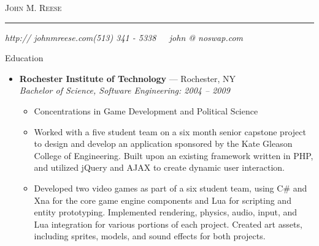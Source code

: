 \documentclass[11pt,oneside]{article}
\makeatletter
\newcommand{\name}{John M. Reese}
\newcommand{\phone}{(513) 341 - 5338}
\newcommand{\email}{john @ noswap.com}
\newcommand{\website}{http:// johnmreese.com}
\newcommand{\bigname}[1]{
	\begin{center}\fontfamily{ppl}\selectfont\Huge\scshape#1\end{center}
}
\newenvironment{ressection}[1]{
	\vspace{8pt}
	{\fontfamily{phv}\selectfont\Large#1}
	\begin{itemize}
	\vspace{3pt}
}{
	\end{itemize}
}
\newcommand{\ressubitem}[1]{
	\vspace{-1pt}
	\item \begin{flushleft} #1 \end{flushleft}
}
\newcommand{\resbigitem}[3]{
	\vspace{-5pt}
	\item
	\textbf{#1} --- #2 \\
	\textit{#3}
}
\newenvironment{ressubsec}[3]{
	\resbigitem{#1}{#2}{#3}
	\vspace{-2pt}
	\begin{itemize}
}{
	\end{itemize}
}
\makeatother
\begin{document}
 \selectfont

\bigname{\name}

\vspace{-8pt} \rule{\textwidth}{1pt}

\vspace{-1pt} {\small\itshape \website \hfill \phone \ \ \ \email}

\vspace{8 pt}




\begin{ressection}{Education}

	\begin{ressubsec}{Rochester Institute of Technology}{Rochester, NY}
	{Bachelor of Science, Software Engineering:  2004 -- 2009}
		\ressubitem{Concentrations in Game Development and Political Science}
		\ressubitem{Worked with a five student team on a six month senior capstone project
		to design and develop an application sponsored by the Kate Gleason College of Engineering.
		Built upon an existing framework written in PHP, and utilized jQuery and AJAX to create
		dynamic user interaction.}
		\ressubitem{Developed two video games as part of a six student team, using C\# and Xna for
		the core game engine components and Lua for scripting and entity prototyping.  Implemented
		rendering, physics, audio, input, and Lua integration for various portions of each project.
		Created art assets, including sprites, models, and sound effects for both projects.}
	\end{ressubsec}

\end{ressection}
\end{document}
